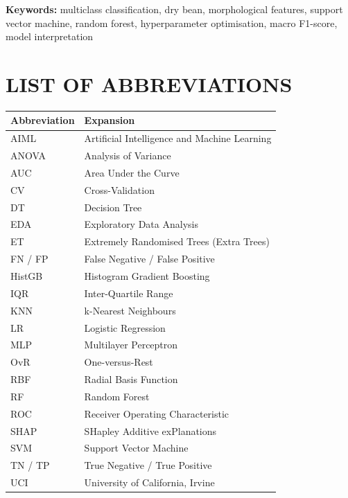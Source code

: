 \vspace{0.5cm}
\noindent\textbf{Keywords:} multiclass classification, dry bean, morphological
features, support vector machine, random forest, hyperparameter optimisation,
macro F1-score, model interpretation

\clearpage
\tableofcontents
\clearpage
\listoffigures
{}
\clearpage
\listoftables
{}
\clearpage

\chapter*{LIST OF ABBREVIATIONS}
\thispagestyle{frontmatter}

\begin{table}[h!]
\centering
\begin{tabular}{ll}
\toprule
\textbf{Abbreviation} & \textbf{Expansion} \\
\midrule
AIML & Artificial Intelligence and Machine Learning \\
ANOVA & Analysis of Variance \\
AUC & Area Under the Curve \\
CV & Cross-Validation \\
DT & Decision Tree \\
EDA & Exploratory Data Analysis \\
ET & Extremely Randomised Trees (Extra Trees) \\
FN / FP & False Negative / False Positive \\
HistGB & Histogram Gradient Boosting \\
IQR & Inter-Quartile Range \\
KNN & k-Nearest Neighbours \\
LR & Logistic Regression \\
MLP & Multilayer Perceptron \\
OvR & One-versus-Rest \\
RBF & Radial Basis Function \\
RF & Random Forest \\
ROC & Receiver Operating Characteristic \\
SHAP & SHapley Additive exPlanations \\
SVM & Support Vector Machine \\
TN / TP & True Negative / True Positive \\
UCI & University of California, Irvine \\
\bottomrule
\end{tabular}
\end{table}
